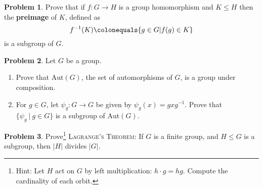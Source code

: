 \documentclass[11pt]{article}
\theoremstyle{definition}
\newtheorem{problem}{Problem}
\begin{document}
\noindent



\begin{problem}
Prove that if $f\!:G\to H$ is a group homomorphism and $K\leq H$ then the {\bf preimage} of $K$, defined as 
$$f^{-1}(K) \colonequals \{g\in G | f(g)\in K\}$$ 
is a subgroup of $G$.
\end{problem}



\begin{problem} Let $G$ be a group.
\begin{enumerate}[(4.1)]
\item Prove that $\mathrm{Aut}(G)$, the set of automorphisms of $G$, is a group under composition.
\item For $g\in G$, let $\psi_g: G\to G$ be given by $\psi_g(x) = gxg^{-1}$. Prove that $\{ \psi_g \ | \ g\in G\}$ is a subgroup of $\mathrm{Aut}(G)$. 
\end{enumerate}
\end{problem}

\begin{problem} Prove\footnote{Hint: Let $H$ act on $G$ by left multiplication: $h \cdot g= hg$. Compute the cardinality of each orbit.} \textsc{Lagrange's Theorem:} If $G$ is a finite group, and $H\leq G$ is a subgroup, then $|H|$ divides $|G|$. 
\end{problem}
\end{document}
